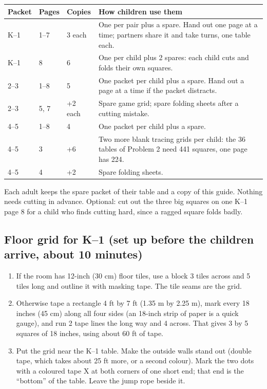 \documentclass[11pt,letterpaper]{article}
\begin{document}
\smallskip
{\small
\begin{tabularx}{\linewidth}{@{}l l l X@{}}
\toprule
Packet & Pages & Copies & How children use them\\
\midrule
K--1 & 1--7 & 3 each & One per pair plus a spare. Hand out one page at a time; partners share it and take turns, one table each.\\
K--1 & 8 & 6 & One per child plus 2 spares: each child cuts and folds their own squares.\\
2--3 & 1--8 & 5 & One packet per child plus a spare. Hand out a page at a time if the packet distracts.\\
2--3 & 5, 7 & +2 each & Spare game grid; spare folding sheets after a cutting mistake.\\
4--5 & 1--8 & 4 & One packet per child plus a spare.\\
4--5 & 3 & +6 & Two more blank tracing grids per child: the 36 tables of Problem 2 need 441 squares, one page has 224.\\
4--5 & 4 & +2 & Spare folding sheets.\\
\bottomrule
\end{tabularx}}

Each adult keeps the spare packet of their table and a copy of this guide. Nothing needs cutting in advance. Optional: cut out the three big squares on one K--1 page 8 for a child who finds cutting hard, since a ragged square folds badly.

\subsection{Floor grid for K--1 (set up before the children arrive, about 10 minutes)}
\begin{enumerate}
\item If the room has 12-inch (30 cm) floor tiles, use a block 3 tiles across and 5 tiles long and outline it with masking tape. The tile seams are the grid.
\item Otherwise tape a rectangle 4\textonehalf{} ft by 7\textonehalf{} ft (1.35 m by 2.25 m), mark every 18 inches (45 cm) along all four sides (an 18-inch strip of paper is a quick gauge), and run 2 tape lines the long way and 4 across. That gives 3 by 5 squares of 18 inches, using about 60 ft of tape.
\item Put the grid near the K--1 table. Make the outside walls stand out (double tape, which takes about 25 ft more, or a second colour). Mark the two dots with a coloured tape X at both corners of one short end; that end is the ``bottom'' of the table. Leave the jump rope beside it.
\end{enumerate}
\end{document}
